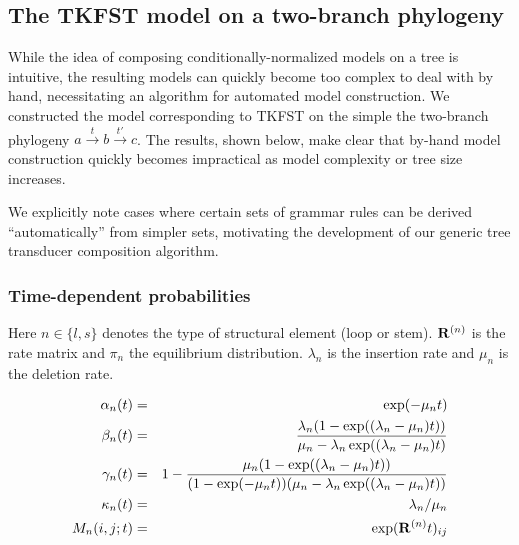 \newcommand\abc{$a \stackrel{t}{\to} b \stackrel{t'}{\to} c$}
\newcommand\ab{$a \stackrel{t}{\to} b$}
\newcommand\bc{$b \stackrel{t'}{\to} c$}
\newcommand\ac{$a \stackrel{t+t'}{\longrightarrow} c$}

\newcommand\agapbc{a\gap bc}
\newcommand\abgapc{ab\gap c}

\newcommand\abcstates{``$abc$'' states (post emission at $c$)}
\newcommand\abgapcstates{``$\abgapc$'' states (post deletion on \bc\ branch)}
\newcommand\agapbcstates{``$\agapbc$'' states (post deletion on \ab\ branch)}




\subsection*{The TKFST model on a two-branch phylogeny}

While the idea of composing conditionally-normalized models on a tree
is intuitive, the resulting models can quickly become too complex to
deal with by hand, necessitating an algorithm for automated model
construction.  We constructed the model corresponding to TKFST on the
simple the two-branch phylogeny \abc.
The results, shown below, make clear that by-hand model construction
quickly becomes impractical as model complexity or tree size
increases.

We explicitly note cases where certain sets of grammar rules can be derived
``automatically'' from simpler sets, motivating the development of our
generic tree transducer composition algorithm.


\subsubsection*{Time-dependent probabilities}

Here $n \in \{ l, s \}$ denotes the type of structural element (loop or stem).
${\bf R}^{(n)}$ is the rate matrix and $\pi_n$ the equilibrium distribution.
$\lambda_n$ is the insertion rate and $\mu_n$ is the deletion rate.

\begin{eqnarray*}
\alpha_n(t) & = & \exp (-\mu_n t) \\
\beta_n(t)  & = & \frac {\lambda_n (1 - \exp((\lambda_n-\mu_n)t))} {\mu_n - \lambda_n \exp((\lambda_n-\mu_n)t)} \\
\gamma_n(t) & = & 1 - \frac {\mu_n (1 - \exp((\lambda_n-\mu_n)t))} {(1 - \exp(-\mu_n t))(\mu_n - \lambda_n \exp((\lambda_n-\mu_n)t))}\\
\kappa_n(t) & = & \lambda_n / \mu_n \\
M_n(i,j;t)  & = & \exp({\bf R}^{(n)} t)_{ij}
\end{eqnarray*}

